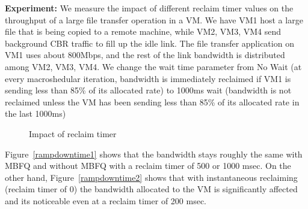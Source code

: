 {\bf Experiment:} We measure the impact of different reclaim timer values on the
throughput of a large file transfer operation in a VM.  We have VM1 host a large
file that is being copied to a remote machine, while VM2, VM3, VM4 send background CBR traffic
to fill up the idle link.  The file transfer application on
VM1 uses about 800Mbps, and the rest of the link bandwidth is distributed among
VM2, VM3, VM4.  We change the wait time parameter from No Wait (at every
macroshedular iteration, bandwidth is immediately reclaimed if VM1 is
sending less than 85\% of its allocated rate) to 1000ms wait (bandwidth is not
reclaimed unless the VM has been sending less than 85\% of its allocated rate in
the last 1000ms)

\begin{figure}[h]
\centering
{}
\vspace{-1em}
\caption{Impact of reclaim timer}
\vspace{-1em}
\label{fig:reclaim}
\end{figure}

Figure~\ref{rampdowntime1} shows that the bandwidth stays roughly the same with
MBFQ and without MBFQ with a reclaim timer of 500 or 1000 msec. On the other
hand, Figure~\ref{rampdowntime2} shows that with instantaneous reclaiming
(reclaim timer of 0) the bandwidth allocated to the VM is significantly affected
and its noticeable even at a reclaim timer of 200 msec.

